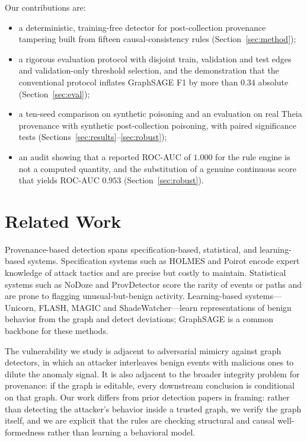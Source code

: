 \documentclass[conference]{IEEEtran}
\begin{document}
Our contributions are:
\begin{itemize}
\item a deterministic, training-free detector for post-collection provenance
tampering built from fifteen causal-consistency rules (Section~\ref{sec:method});
\item a rigorous evaluation protocol with disjoint train, validation and test
edges and validation-only threshold selection, and the demonstration that the
conventional protocol inflates GraphSAGE F1 by more than $0.34$ absolute
(Section~\ref{sec:eval});
\item a ten-seed comparison on synthetic poisoning and an evaluation on real
Theia provenance with synthetic post-collection poisoning, with paired
significance tests (Sections~\ref{sec:results}--\ref{sec:robust});
\item an audit showing that a reported ROC-AUC of $1.000$ for the rule engine
is not a computed quantity, and the substitution of a genuine continuous score
that yields ROC-AUC $0.953$ (Section~\ref{sec:robust}).
\end{itemize}

\section{Related Work}
Provenance-based detection spans specification-based, statistical, and
learning-based systems. Specification systems such as HOLMES and Poirot encode
expert knowledge of attack tactics and are precise but costly to maintain.
Statistical systems such as NoDoze and ProvDetector score the rarity of events
or paths and are prone to flagging unusual-but-benign activity. Learning-based
systems---Unicorn, FLASH, MAGIC and ShadeWatcher---learn representations of
benign behavior from the graph and detect deviations; GraphSAGE is a common
backbone for these methods.

The vulnerability we study is adjacent to adversarial mimicry against graph
detectors, in which an attacker interleaves benign events with malicious ones to
dilute the anomaly signal. It is also adjacent to the broader integrity problem
for provenance: if the graph is editable, every downstream conclusion is
conditional on that graph. Our work differs from prior detection papers in
framing: rather than detecting the attacker's behavior inside a trusted graph,
we verify the graph itself, and we are explicit that the rules are checking
structural and causal well-formedness rather than learning a behavioral model.
\end{document}
